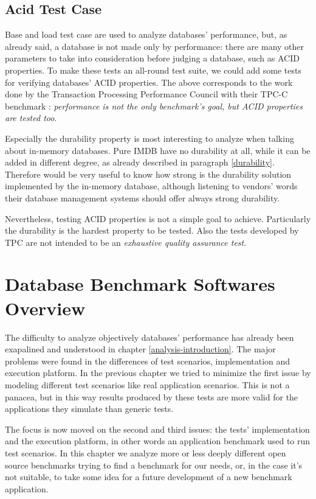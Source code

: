 	\section{Acid Test Case}
Base and load test case are used to analyze databases' performance, but, as already said, a database is not made only by performance: there are many other parameters to take into consideration before judging a database, such as ACID properties. To make these tests an all-round test suite, we could add some tests for verifying databases' ACID properties. The above corresponds to the work done by the Transaction Processing Performance Council with their TPC-C benchmark \cite{TPC-C}: \emph{performance is not the only benchmark's goal, but ACID properties are tested too}.

Especially the durability property is most interesting to analyze when talking about in-memory databases. Pure IMDB have no durability at all, while it can be added in different degree, as already described in paragraph \ref{durability}. Therefore would be very useful to know how strong is the durability solution implemented by the in-memory database, although listening to vendors' words their database management systems should offer always strong durability.

Nevertheless, testing ACID properties is not a simple goal to achieve. Particularly the durability is the hardest property to be tested. Also the tests developed by TPC are not intended to be an \emph{exhaustive quality assurance test}.

\chapter{Database Benchmark Softwares Overview} \label{overview}
The difficulty to analyze objectively databases' performance has already been exapalined and understood in chapter \ref{analysis-introduction}. The major problems were found in the differences of test scenarios, implementation and execution platform. In the previous chapter we tried to minimize the first issue by modeling different test scenarios like real application scenarios. This is not a panacea, but in this way results produced by these tests are more valid for the applications they simulate than generic tests. 

The focus is now moved on the second and third issues: the tests' implementation and the execution platform, in other words an application benchmark used to run test scenarios. In this chapter we analyze more or less deeply different open source benchmarks trying to find a benchmark for our needs, or, in the case it's not suitable, to take some idea for a future development of a new benchmark application.

